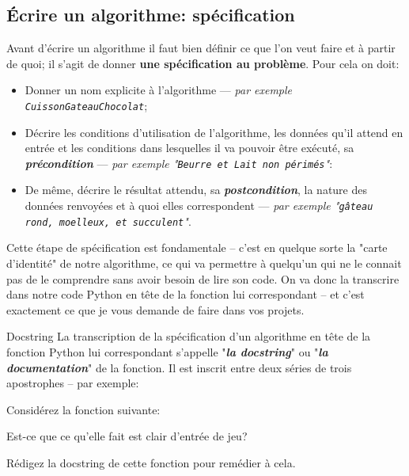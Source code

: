 \documentclass[12pt]{article}
\begin{document}
	\subsection{Écrire un algorithme: spécification}
	
	Avant d'écrire un algorithme il faut bien définir ce que l'on veut faire et à partir de quoi; il s'agit de donner \textbf{une spécification au problème}. Pour cela on doit:
	\begin{itemize}
		\item Donner un nom explicite à l’algorithme --- \textit{par exemple \texttt{CuissonGateauChocolat}};
		\item Décrire les conditions d'utilisation de l'algorithme, les données qu'il attend en entrée et les conditions dans lesquelles il va pouvoir être exécuté, sa \textbf{\textit{précondition}} --- \textit{par exemple "\texttt{Beurre et Lait non périmés}"}:
		\item De même, décrire le résultat attendu, sa \textbf{\textit{postcondition}}, la nature des données renvoyées et à quoi elles correspondent --- \textit{par exemple "\texttt{gâteau rond, moelleux, et succulent}"}.
	\end{itemize}
	
	Cette étape de spécification est fondamentale -- c'est en quelque sorte la "carte d'identité" de notre algorithme, ce qui va permettre à quelqu'un qui ne le connait pas de le comprendre sans avoir besoin de lire son code. On va donc la transcrire dans notre code Python en tête de la fonction lui correspondant -- et c'est exactement ce que je vous demande de faire dans vos projets.
	
	
	\begin{MaRgl}{Docstring}
		La transcription de la spécification d'un algorithme en tête de la fonction Python lui correspondant s'appelle "\textit{\textbf{la docstring}}" ou "\textit{\textbf{la documentation}}" de la fonction. Il est inscrit entre deux séries de trois apostrophes -- par exemple:
	\end{MaRgl}
	
	\begin{MonExo}
		Considérez la fonction suivante:
		
		Est-ce que ce qu'elle fait est clair d'entrée de jeu? 
		
		Rédigez la docstring de cette fonction pour remédier à cela.
	\end{MonExo}
	
\end{document}
